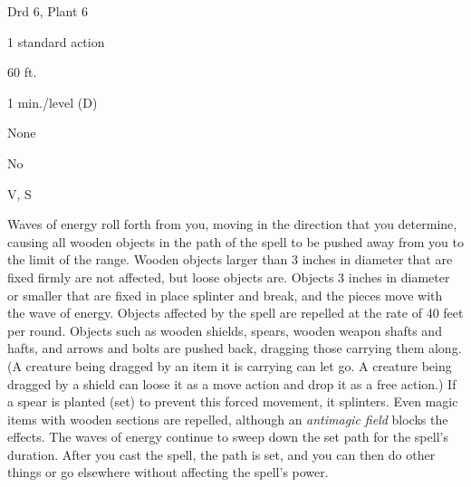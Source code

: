 
\begin{description*}
\item[Level:] Drd 6, Plant 6
\item[Casting Time:] 1 standard action
\item[Range:] 60 ft.
\item[Duration:] 1 min./level (D)
\item[Saving Throw:] None
\item[Spell Resistance:] No
\item[Components:] V, S
\end{description*}

Waves of energy roll forth from you, moving in the direction that you determine,
causing all wooden objects in the path of the spell to be pushed away from you
to the limit of the range. Wooden objects larger than 3 inches in diameter that
are fixed firmly are not affected, but loose objects are. Objects 3 inches in diameter
or smaller that are fixed in place splinter and break, and the pieces move with
the wave of energy. Objects affected by the spell are repelled at the rate of 40
feet per round.
Objects such as wooden shields, spears, wooden weapon shafts and hafts, and arrows
and bolts are pushed back, dragging those carrying them along. (A creature being
dragged by an item it is carrying can let go. A creature being dragged by a shield
can loose it as a move action and drop it as a free action.) If a spear is planted
(set) to prevent this forced movement, it splinters. Even magic items with wooden
sections are repelled, although an \textit{antimagic field} blocks the effects.
The waves of energy continue to sweep down the set path for the spell's duration.
After you cast the spell, the path is set, and you can then do other things or
go elsewhere without affecting the spell's power.